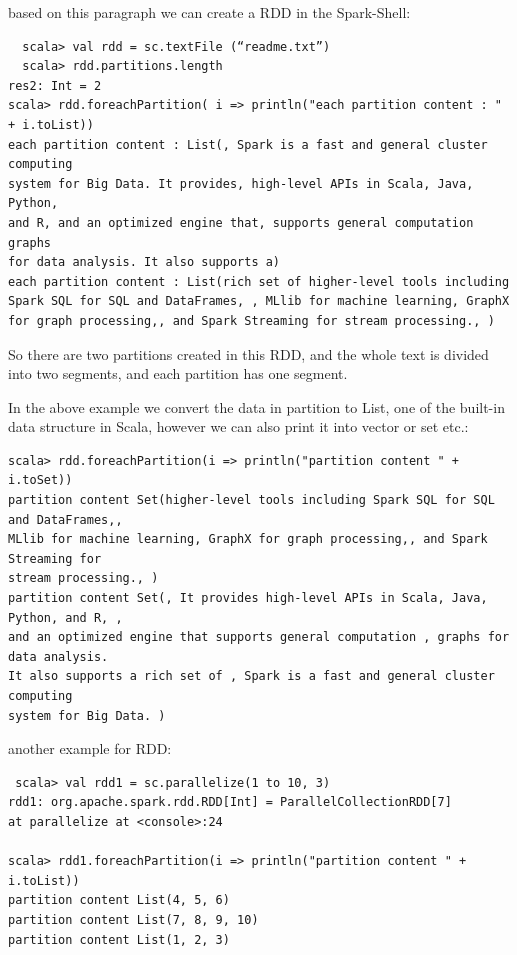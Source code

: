 \documentclass[notheorems, aspectratio=54]{beamer}
\begin{document}
\begin{frame}[fragile]

  based on this paragraph we can create a RDD in the Spark-Shell:
  \begin{verbatim}
  scala> val rdd = sc.textFile (“readme.txt”)   
  scala> rdd.partitions.length
res2: Int = 2
scala> rdd.foreachPartition( i => println("each partition content : " + i.toList))
each partition content : List(, Spark is a fast and general cluster computing 
system for Big Data. It provides, high-level APIs in Scala, Java, Python, 
and R, and an optimized engine that, supports general computation graphs 
for data analysis. It also supports a)
each partition content : List(rich set of higher-level tools including 
Spark SQL for SQL and DataFrames, , MLlib for machine learning, GraphX 
for graph processing,, and Spark Streaming for stream processing., )
  \end{verbatim}
So there are two partitions created in this RDD, 
and the whole text is divided into two
segments, and each partition has one segment.

\end{frame}


\begin{frame}[fragile]

In the above example we convert the data in partition to List, one of the built-in data
structure in Scala, however we can also print it into vector or set etc.:
\begin{verbatim}
scala> rdd.foreachPartition(i => println("partition content " + i.toSet))
partition content Set(higher-level tools including Spark SQL for SQL and DataFrames,, 
MLlib for machine learning, GraphX for graph processing,, and Spark Streaming for 
stream processing., )
partition content Set(, It provides high-level APIs in Scala, Java, Python, and R, , 
and an optimized engine that supports general computation , graphs for data analysis. 
It also supports a rich set of , Spark is a fast and general cluster computing 
system for Big Data. )
\end{verbatim}
\end{frame}



\begin{frame}[fragile]

another example for RDD:
\begin{verbatim}
 scala> val rdd1 = sc.parallelize(1 to 10, 3)
rdd1: org.apache.spark.rdd.RDD[Int] = ParallelCollectionRDD[7] 
at parallelize at <console>:24

scala> rdd1.foreachPartition(i => println("partition content " + i.toList))
partition content List(4, 5, 6)
partition content List(7, 8, 9, 10)
partition content List(1, 2, 3)
\end{verbatim}

\end{frame}
\end{document}
